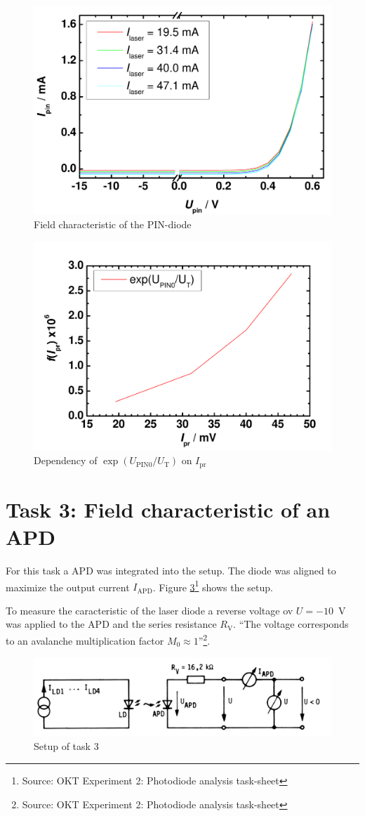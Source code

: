 \begin{figure}%
\centering
\includegraphics[width=.6\columnwidth]{Grafiken/PIN_kombiniert.pdf}%
\caption{Field characteristic of the PIN-diode}%
\label{fig:PIN_kombiniert}%
\end{figure}
\begin{figure}%
\centering
\includegraphics[width=.6\columnwidth]{Grafiken/UPIN0.pdf}%
\caption{Dependency of $\exp(U_{\mathrm{PIN0}}/U_{\mathrm{T}})$ on $I_{\mathrm{pr}}$}%
\label{fig:UPIN0}%
\end{figure}
\section{Task 3: Field characteristic of an APD}

For this task a APD was integrated into the setup. The diode was aligned to maximize the output current $I_{\mathrm{APD}}$.
Figure \ref{fig:T3_setup}\footnote[3]{Source: OKT Experiment 2: Photodiode analysis task-sheet} shows the setup.

To measure the caracteristic of the laser diode a reverse voltage ov $U = -10$~V was applied to the APD and the series resistance $R_{\mathrm{V}}$. ``The voltage corresponds to an avalanche multiplication factor $M_0 \approx 1$''\footnote[3]{Source: OKT Experiment 2: Photodiode analysis task-sheet}.

\begin{figure}%
\centering
\includegraphics[width=.85\columnwidth]{Grafiken/T3_setup.jpg}%
\caption{Setup of task 3}%
\label{fig:T3_setup}%
\end{figure}



